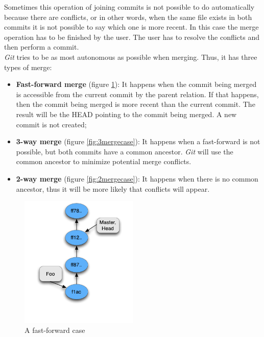 Sometimes this operation of joining commits is not possible to do
automatically because there are conflicts, or in other words, when
the same file exists in both commits it is
not possible to say which one is more recent. In this case the merge
operation has to be finished by the user. The user has to resolve the
conflicts and then perform a commit.\\

\emph{Git} tries to be as most autonomous as possible when merging.
Thus, it has three types of merge:

\begin{itemize}
   \item \textbf{Fast-forward merge} (figure \ref{fig:fast_forward}):
   It happens when the commit being merged is accessible from the current commit by the 
   parent relation. If that happens, then the commit being merged is more recent
   than the current commit. The result will be the HEAD pointing to
   the commit being merged. A new commit is not created;
   
   \item \textbf{3-way merge} (figure \ref{fig:3mergecase}): 
   It happens when a fast-forward is not possible, but both commits have a common
   ancestor. \emph{Git} will use the common ancestor to minimize potential
   merge conflicts.
   
   \item \textbf{2-way merge} (figure \ref{fig:2mergecase}): 
   It happens when there is no
   common ancestor, thus it will be more likely that conflicts will
   appear.
\end{itemize}

\begin{figure}[tp]
   \centering
   \includegraphics[width=0.5\textwidth]{images/fast_forward.png}
   \caption{A fast-forward case}\label{fig:fast_forward}
\end{figure}

